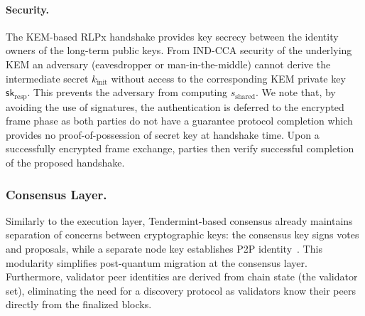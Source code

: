 

\paragraph{Security.}\label{para:rlpx-security}
The KEM-based RLPx handshake provides key secrecy between the identity owners of the long-term public keys.
From IND-CCA security of the underlying KEM an adversary (eavesdropper or man-in-the-middle) cannot derive the intermediate secret $k_{\text{init}}$ without access to the corresponding KEM private key $\mathsf{sk}_{\text{resp}}$.
This prevents the adversary from computing $s_\text{shared}$.
We note that, by avoiding the use of signatures, the authentication is deferred to the encrypted frame phase as both parties do not have a guarantee protocol completion which provides no proof-of-possession of secret key at handshake time.  
Upon a successfully encrypted frame exchange, parties then verify successful completion of the proposed handshake.



\subsubsection{Consensus Layer.}\label{subsubsec:consensus-p2p}

Similarly to the execution layer, Tendermint-based consensus already maintains separation of concerns between cryptographic keys: the consensus key signs votes and proposals, while a separate node key establishes P2P identity~\cite{tendermint_p2p_spec,tendermint_consensus_spec}.
This modularity simplifies post-quantum migration at the consensus layer.
Furthermore, validator peer identities are derived from chain state (the validator set), eliminating the need for a discovery protocol as validators know their peers directly from the finalized blocks.

